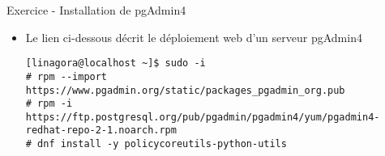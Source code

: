 
\begin{frame}[fragile]{Exercice - Installation de pgAdmin4}

   \begin{itemize}
      \item Le lien ci-dessous décrit le déploiement web d'un serveur pgAdmin4

\begin{tiny}
\begin{Verbatim}[commandchars=\\\{\}]
[linagora@localhost ~]$ sudo -i
# rpm --import https://www.pgadmin.org/static/packages_pgadmin_org.pub
# rpm -i https://ftp.postgresql.org/pub/pgadmin/pgadmin4/yum/pgadmin4-redhat-repo-2-1.noarch.rpm
# dnf install -y policycoreutils-python-utils
\end{Verbatim}
\end{tiny}

   \end{itemize}

\begin{tiny}
\begin{toile}
\end{toile}
\end{tiny}

\end{frame}


